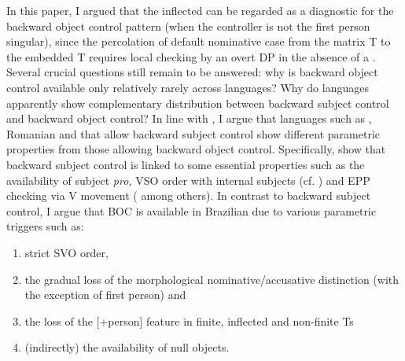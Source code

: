 \documentclass[output=paper]{langsci/langscibook}
\begin{document}
In this paper, I argued that the inflected  can be regarded as a diagnostic for the backward object control pattern (when the controller is not the first person singular), since the percolation of default nominative case from the matrix T to the embedded T requires local checking by an overt DP in the absence of a . Several crucial questions still remain to be answered: why is backward object control available only relatively rarely across languages? Why do languages apparently show complementary distribution between backward subject control and backward object control? In line with \citet{Alexiadou2010}, I argue that languages such as , Romanian and  that allow backward subject control show different parametric properties from those allowing backward object control. Specifically, \citet{Alexiadou2010} show that backward subject control is linked to some essential properties such as the availability of subject \textit{pro,} VSO order with internal subjects (cf. \citealt{Alexiadou2001Functional}) and EPP checking via V movement (\citealt{Alexiadou1998} among others). In contrast to backward subject control, I argue that BOC is available in Brazilian  due to various parametric triggers such as:

\begin{enumerate}
\item strict SVO order, 
\item the gradual loss of the morphological nominative\slash accusative distinction (with the exception of first person) and 
\item the loss of the [+person] feature in finite, inflected  and non-finite Ts
\item (indirectly) the availability of null objects. 
\end{enumerate}
\end{document}

